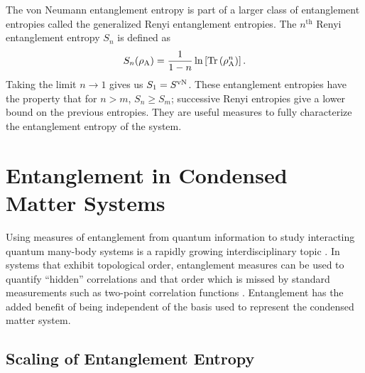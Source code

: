 The von Neumann entanglement entropy is part of a larger class of entanglement entropies called the generalized Renyi entanglement entropies.
The $n^\text{th}$ Renyi entanglement entropy $S_n$ is defined as
\begin{equation} \label{renyi}
 	S_n(\rho_{\rm A}) = \frac{1}{1-n}\ln\left[{\rm Tr}\left( \rho_{\rm A}^n \right) \right].
\end{equation}
Taking the limit $n\to1$ gives us $S_1 = S^{\text{vN}}$.  These entanglement entropies have the property that for $n>m$, $S_n\ge S_m$; successive Renyi entropies give a lower bound on the previous entropies. They are useful measures to fully characterize the entanglement entropy of the system.



\section{Entanglement in Condensed Matter Systems}

Using measures of entanglement from quantum information to study interacting quantum many-body systems is a rapidly growing interdisciplinary topic \cite{Amico, intro}.
In systems that exhibit topological order, entanglement measures can be used to quantify ``hidden'' correlations \cite{wolf} and that order which is missed by standard measurements such as two-point correlation functions \cite{Bbob, KP, LW, Spectrum}.
Entanglement has the added benefit of being independent of the basis used to represent the condensed matter system.

\subsection{Scaling of Entanglement Entropy}
\label{1dcft}

